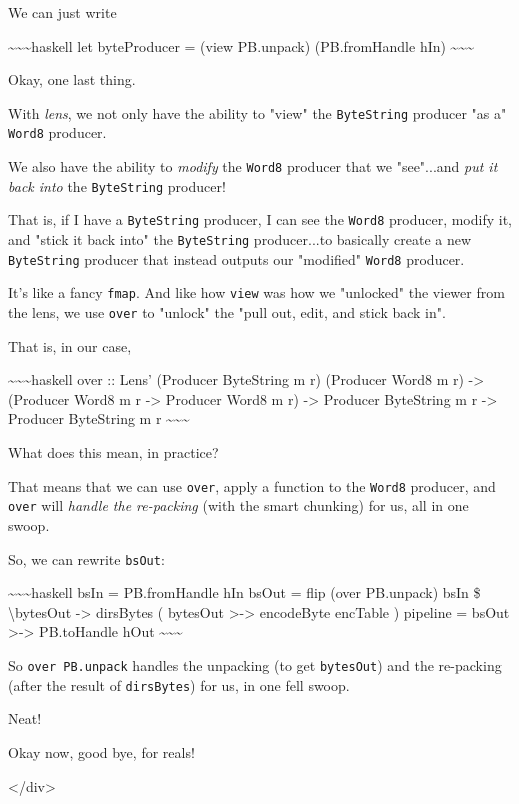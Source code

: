 \documentclass[]{article}
\begin{document}
We can just write

\textasciitilde{}\textasciitilde{}\textasciitilde{}haskell let byteProducer =
(view PB.unpack) (PB.fromHandle hIn)
\textasciitilde{}\textasciitilde{}\textasciitilde{}

Okay, one last thing.

With \emph{lens}, we not only have the ability to "view" the \texttt{ByteString}
producer "as a" \texttt{Word8} producer.

We also have the ability to \emph{modify} the \texttt{Word8} producer that we
"see"...and \emph{put it back into} the \texttt{ByteString} producer!

That is, if I have a \texttt{ByteString} producer, I can see the \texttt{Word8}
producer, modify it, and "stick it back into" the \texttt{ByteString}
producer...to basically create a new \texttt{ByteString} producer that instead
outputs our "modified" \texttt{Word8} producer.

It's like a fancy \texttt{fmap}. And like how \texttt{view} was how we
"unlocked" the viewer from the lens, we use \texttt{over} to "unlock" the "pull
out, edit, and stick back in".

That is, in our case,

\textasciitilde{}\textasciitilde{}\textasciitilde{}haskell over :: Lens'
(Producer ByteString m r) (Producer Word8 m r) -\textgreater{} (Producer Word8 m
r -\textgreater{} Producer Word8 m r) -\textgreater{} Producer ByteString m r
-\textgreater{} Producer ByteString m r
\textasciitilde{}\textasciitilde{}\textasciitilde{}

What does this mean, in practice?

That means that we can use \texttt{over}, apply a function to the \texttt{Word8}
producer, and \texttt{over} will \emph{handle the re-packing} (with the smart
chunking) for us, all in one swoop.

So, we can rewrite \texttt{bsOut}:

\textasciitilde{}\textasciitilde{}\textasciitilde{}haskell bsIn = PB.fromHandle
hIn bsOut = flip (over PB.unpack) bsIn \$ \textbackslash{}bytesOut
-\textgreater{} dirsBytes ( bytesOut \textgreater{}-\textgreater{} encodeByte
encTable ) pipeline = bsOut \textgreater{}-\textgreater{} PB.toHandle hOut
\textasciitilde{}\textasciitilde{}\textasciitilde{}

So \texttt{over\ PB.unpack} handles the unpacking (to get \texttt{bytesOut}) and
the re-packing (after the result of \texttt{dirsBytes}) for us, in one fell
swoop.

Neat!

Okay now, good bye, for reals!

\textless{}/div\textgreater{}
\end{document}
